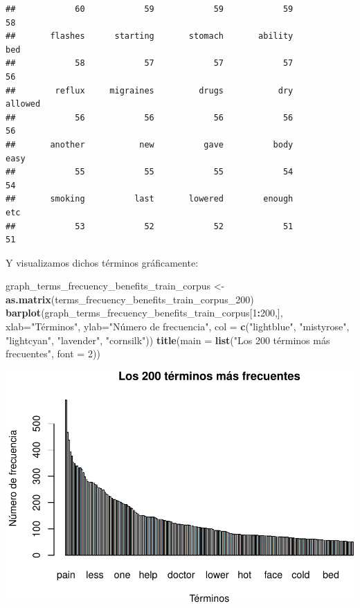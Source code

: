 \documentclass[spanish,]{article}
\newenvironment{Shaded}{\begin{snugshade}}{\end{snugshade}}
\newcommand{\KeywordTok}[1]{\textcolor[rgb]{0.13,0.29,0.53}{\textbf{#1}}}
\newcommand{\DataTypeTok}[1]{\textcolor[rgb]{0.13,0.29,0.53}{#1}}
\newcommand{\DecValTok}[1]{\textcolor[rgb]{0.00,0.00,0.81}{#1}}
\newcommand{\StringTok}[1]{\textcolor[rgb]{0.31,0.60,0.02}{#1}}
\newcommand{\OperatorTok}[1]{\textcolor[rgb]{0.81,0.36,0.00}{\textbf{#1}}}
\newcommand{\NormalTok}[1]{#1}
\begin{document}
\begin{verbatim}
##            60            59            59            59            58 
##       flashes      starting       stomach       ability           bed 
##            58            57            57            57            56 
##        reflux     migraines         drugs           dry       allowed 
##            56            56            56            56            56 
##       another           new          gave          body          easy 
##            55            55            55            54            54 
##       smoking          last       lowered        enough           etc 
##            53            52            52            51            51
\end{verbatim}

Y visualizamos dichos términos gráficamente:

\begin{Shaded}
\begin{Highlighting}[]
\NormalTok{graph_terms_frecuency_benefits_train_corpus <-}\StringTok{ }\KeywordTok{as.matrix}\NormalTok{(terms_frecuency_benefits_train_corpus_}\DecValTok{200}\NormalTok{)}
\KeywordTok{barplot}\NormalTok{(graph_terms_frecuency_benefits_train_corpus[}\DecValTok{1}\OperatorTok{:}\DecValTok{200}\NormalTok{,],  }\DataTypeTok{xlab=}\StringTok{"Términos"}\NormalTok{, }\DataTypeTok{ylab=}\StringTok{"Número de frecuencia"}\NormalTok{,}
        \DataTypeTok{col =} \KeywordTok{c}\NormalTok{(}\StringTok{"lightblue"}\NormalTok{, }\StringTok{"mistyrose"}\NormalTok{, }\StringTok{"lightcyan"}\NormalTok{, }\StringTok{"lavender"}\NormalTok{, }\StringTok{"cornsilk"}\NormalTok{))}
\KeywordTok{title}\NormalTok{(}\DataTypeTok{main =} \KeywordTok{list}\NormalTok{(}\StringTok{"Los 200 términos más frecuentes"}\NormalTok{, }\DataTypeTok{font =} \DecValTok{2}\NormalTok{))}
\end{Highlighting}
\end{Shaded}

\includegraphics{practica_files/figure-latex/unnamed-chunk-22-1.pdf}
\end{document}
